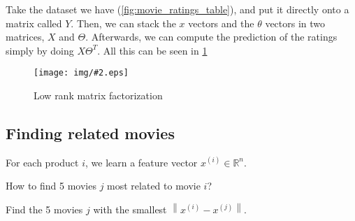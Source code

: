 \documentclass[10pt]{extarticle}
\newcommand{\norm}[1]{\left\lVert#1\right\rVert}
\newcommand{\stdfig}[3]{
    \begin{figure}
    \centering
    \texttt{[image: img/\#2.eps]}
    \caption{#3}
    \label{fig:#2}
    \end{figure}
}
\begin{document}
Take the dataset we have (\cref{fig:movie_ratings_table}), and put it
directly onto a matrix called $Y$. Then, we can stack the $x$ vectors
and the $\theta$ vectors in two matrices, $X$ and $\Theta$. Afterwards,
we can compute the prediction of the ratings simply by doing
$X\Theta^T$. All this can be seen in
\cref{fig:low_rank_matrix_factorization}

\stdfig{10cm}{low_rank_matrix_factorization}{Low rank matrix factorization}

\subsection{Finding related movies}\label{finding-related-movies}

For each product $i$, we learn a feature vector
$x^{(i)} \in \mathbb{R}^n$.

How to find 5 movies $j$ most related to movie $i$?

Find the 5 movies $j$ with the smallest $\norm{x^{(i)} - x^{(j)}}$.




\clearpage



    \nocite{*}



\end{document}
